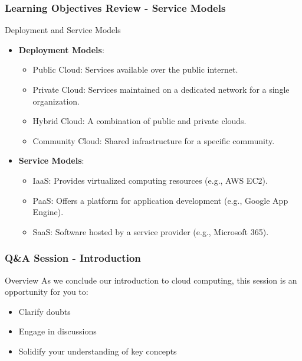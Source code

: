 \documentclass[aspectratio=169]{beamer}
\begin{document}
\begin{frame}[fragile]
    \frametitle{Learning Objectives Review - Service Models}
    \begin{block}{Deployment and Service Models}
        \begin{itemize}
            \item \textbf{Deployment Models}:
            \begin{itemize}
                \item Public Cloud: Services available over the public internet.
                \item Private Cloud: Services maintained on a dedicated network for a single organization.
                \item Hybrid Cloud: A combination of public and private clouds.
                \item Community Cloud: Shared infrastructure for a specific community.
            \end{itemize}
            \item \textbf{Service Models}:
            \begin{itemize}
                \item IaaS: Provides virtualized computing resources (e.g., AWS EC2).
                \item PaaS: Offers a platform for application development (e.g., Google App Engine).
                \item SaaS: Software hosted by a service provider (e.g., Microsoft 365).
            \end{itemize}
        \end{itemize}
    \end{block}
\end{frame}

\begin{frame}[fragile]
    \frametitle{Q\&A Session - Introduction}
    \begin{block}{Overview}
        As we conclude our introduction to cloud computing, this session is an opportunity for you to:
        \begin{itemize}
            \item Clarify doubts
            \item Engage in discussions
            \item Solidify your understanding of key concepts
        \end{itemize}
    \end{block}
\end{frame}
\end{document}
